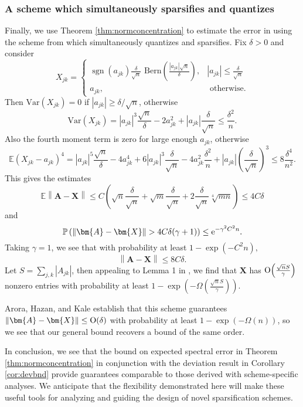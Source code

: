 \documentclass[11pt,letterpaper,twoside,reqno]{amsart}
\newcommand{\e}{\ensuremath{{\rm e}}}
\newcommand{\mat}[1]{\ensuremath{\bm{#1}}}
\newcommand{\E}{\ensuremath{\mathbb{E}}}
\newcommand{\Prob}[1]{\ensuremath{\mathbb{P}\left(#1\right)}}
\newcommand{\norm}[1]{\ensuremath{\left\|#1\right\|}}
\newcommand{\asymO}[1]{\ensuremath{\mathop{\text{\rm O}}\!\left(#1\right)}}
\newcommand{\var}[1]{\ensuremath{\mathrm{Var}(#1)}}
\DeclareMathOperator{\sgn}{sgn}
\begin{document}
\subsubsection{A scheme which simultaneously sparsifies and quantizes}

Finally, we use Theorem \ref{thm:normconcentration} to estimate the error in using the scheme from \cite{AHK06} which simultaneously quantizes and sparsifies. Fix $\delta>0$ and consider 
\[
X_{jk}=\begin{cases}
\sgn(a_{jk})\frac{\delta}{\sqrt{n}}\text{ Bern}\left(\frac{|a_{jk}|\sqrt{n}}{\delta}\right), & |a_{jk}|\leq\frac{\delta}{\sqrt{n}}\\
a_{jk}, & \text{ otherwise}.\end{cases}
\]
Then $\var{X_{jk}}=0$ if $|a_{jk}|\geq\delta/\sqrt{n}$,
otherwise 
\[
\var{X_{jk}}=|a_{jk}|^{3}\frac{\sqrt{n}}{\delta}-2a_{jk}^{2}+|a_{jk}|\frac{\delta}{\sqrt{n}}\leq\frac{\delta^{2}}{n}.
\]
Also the fourth moment term is zero for large enough $a_{jk}$, otherwise
\[
\E(X_{jk}-a_{jk})^{4}=|a_{jk}|^{5}\frac{\sqrt{n}}{\delta}-4a_{jk}^{4}+6|a_{jk}|^{3}\frac{\delta}{\sqrt{n}}-4a_{jk}^{2}\frac{\delta^{2}}{n}+|a_{jk}|\left(\frac{\delta}{\sqrt{n}}\right)^{3}\leq8\frac{\delta^{4}}{n^{2}}.
\]
This gives the estimates 
\[
\E\norm{\mat{A}-\mat{X}}\leq C\left(\sqrt{n}\frac{\delta}{\sqrt{n}}+\sqrt{m}\frac{\delta}{\sqrt{n}}+2\frac{\delta}{\sqrt{n}}\sqrt[4]{mn}\right)\leq4C\delta
\]
and 
\[
\Prob{\norm{\mat{A}-\mat{X}}>4C\delta(\gamma+1)}\leq \e^{-\gamma^{2}C^{2}n}.
\]
Taking $\gamma=1$, we see that with probability at least $1-\exp(-C^{2}n),$
\[
\norm{\mat{A}-\mat{X}}\leq8C\delta.
\]
Let $S=\sum\nolimits_{j,k}|A_{jk}|$, then appealing to Lemma 1 in \cite{AHK06}, we find that $\mat{X}$ has $\asymO{\tfrac{\sqrt{n} S}{\gamma}}$ nonzero entries with probability at least $1-\exp\left(-\Omega\left(\tfrac{\sqrt{n}S}{\gamma}\right)\right)$.

Arora, Hazan, and Kale establish that this scheme guarantees $\norm{\mat{A}-\mat{X}}\leq\asymO{\delta}$ with probability at least $1-\exp(-\Omega(n))$, so we see that our general bound recovers a bound of the same order.

In conclusion, we see that the bound on expected spectral error in Theorem \ref{thm:normconcentration} in conjunction with the deviation result in Corollary \ref{cor:devbnd} provide guarantees comparable to those derived with scheme-specific analyses. We anticipate that the flexibility demonstrated here will make these useful tools for analyzing and guiding the design of novel sparsification schemes.

\nocite{Seg00} 

\end{document}
